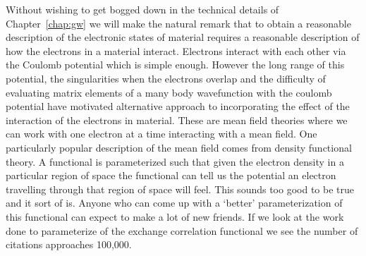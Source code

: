 Without wishing to get bogged down in the technical details of Chapter~\ref{chap:gw}
we will make the natural remark that to obtain a reasonable 
description of the electronic states of material requires
a reasonable description of how the electrons in a material interact. 
Electrons interact
with each other via the Coulomb potential which is simple enough. However the long range of 
this potential, the singularities when the electrons overlap and the difficulty of evaluating
matrix elements of a many body wavefunction with the coulomb potential have motivated alternative
approach to incorporating the effect of the interaction of the electrons in material. These
are mean field theories where we can work with one electron at a time interacting with a mean field.
One particularly popular description of the mean field comes from density functional theory.
A functional is parameterized such that given the electron density in a particular region of space
the functional can tell us the potential an electron travelling through that region of space will feel.
This sounds too good to be true and it sort of is. Anyone who can come up with a 
`better' parameterization of this functional can expect to make a lot of new friends. 
If we look at the work done to parameterize of the exchange correlation functional 
we see the number of citations approaches 100,000.

%

